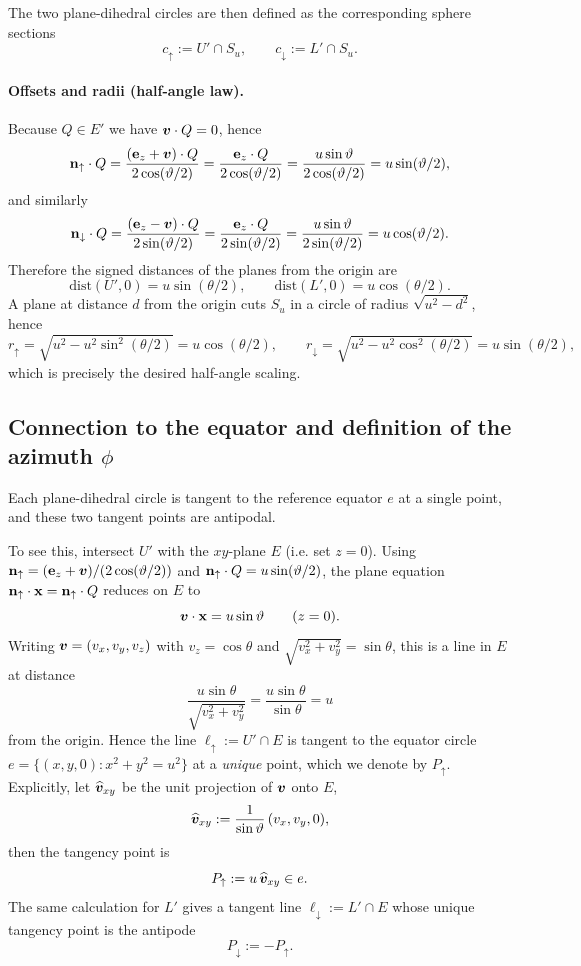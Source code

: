 The two plane-dihedral circles are then defined as the corresponding sphere sections
\[
c_\uparrow := U'\cap S_u,
\qquad
c_\downarrow := L'\cap S_u.
\]

\paragraph{Offsets and radii (half-angle law).}
Because $Q\in E'$ we have $\bm{v}\cdot Q=0$, hence
\[
\mathbf{n}_\uparrow\cdot Q
=
\frac{(\mathbf{e}_{z}+\bm{v})\cdot Q}{2\cos(\vartheta/2)}
=
\frac{\mathbf{e}_{z}\cdot Q}{2\cos(\vartheta/2)}
=
\frac{u\sin\vartheta}{2\cos(\vartheta/2)}
=
u\sin(\vartheta/2),
\]
and similarly
\[
\mathbf{n}_\downarrow\cdot Q
=
\frac{(\mathbf{e}_{z}-\bm{v})\cdot Q}{2\sin(\vartheta/2)}
=
\frac{\mathbf{e}_{z}\cdot Q}{2\sin(\vartheta/2)}
=
\frac{u\sin\vartheta}{2\sin(\vartheta/2)}
=
u\cos(\vartheta/2).
\]
Therefore the signed distances of the planes from the origin are
\[
\mathrm{dist}(U',0)=u\sin(\theta/2),
\qquad
\mathrm{dist}(L',0)=u\cos(\theta/2).
\]
A plane at distance $d$ from the origin cuts $S_u$ in a circle of radius $\sqrt{u^2-d^2}$, hence
\[
r_\uparrow = \sqrt{u^2-u^2\sin^2(\theta/2)} = u\cos(\theta/2),
\qquad
r_\downarrow = \sqrt{u^2-u^2\cos^2(\theta/2)} = u\sin(\theta/2),
\]
which is precisely the desired half-angle scaling.

\subsection{Connection to the equator and definition of the azimuth \texorpdfstring{$\phi$}{phi}}
\label{sec:hyperchords_equator}

Each plane-dihedral circle is tangent to the reference equator $e$ at a single point, and these two tangent
points are antipodal.

To see this, intersect $U'$ with the $xy$-plane $E$ (i.e. set $z=0$). Using
$\mathbf{n}_\uparrow=(\mathbf{e}_{z}+\bm{v})/(2\cos(\vartheta/2))$ and $\mathbf{n}_\uparrow\cdot Q=u\sin(\vartheta/2)$, the plane equation
$\mathbf{n}_\uparrow\cdot\mathbf{x}=\mathbf{n}_\uparrow\cdot Q$ reduces on $E$ to
\[
\bm{v}\cdot\mathbf{x} = u\sin\vartheta
\qquad (z=0).
\]
Writing $\bm{v}=(v_x,v_y,v_z)$ with $v_z=\cos\theta$ and $\sqrt{v_x^2+v_y^2}=\sin\theta$, this is a line in $E$
at distance
\[
\frac{u\sin\theta}{\sqrt{v_x^2+v_y^2}} = \frac{u\sin\theta}{\sin\theta}=u
\]
from the origin. Hence the line $\ell_\uparrow := U'\cap E$ is tangent to the equator circle
$e=\{(x,y,0):x^2+y^2=u^2\}$ at a \emph{unique} point, which we denote by $P_\uparrow$.
Explicitly, let $\widehat{\bm{v}}_{xy}$ be the unit projection of $\bm{v}$ onto $E$,
\[
\widehat{\bm{v}}_{xy} := \frac{1}{\sin\vartheta}\,(v_x,v_y,0),
\]
then the tangency point is
\[
P_\uparrow := u\,\widehat{\bm{v}}_{xy}\in e.
\]
The same calculation for $L'$ gives a tangent line $\ell_\downarrow := L'\cap E$ whose unique tangency point
is the antipode
\[
P_\downarrow := -P_\uparrow.
\]

